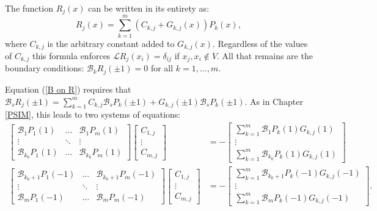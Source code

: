 \documentclass{book}
\begin{document}
The function $R_j(x)$ can be written in its entirety as:
\begin{equation}
R_j(x) = \sum_{k=1}^m (C_{k,j} + G_{k,j}(x) ) P_k(x) ,
\end{equation}
where $C_{k,j}$ is the arbitrary constant added to $G_{k,j}(x)$.
Regardless of the values of $C_{k,j}$ this formula enforces $\mathcal{L} R_j(x_i) = \delta_{ij}$ if $x_j, x_i \notin V$.
All that remains are the boundary conditions: $\mathcal{B}_k R_j( \pm 1) = 0$ for all $k = 1,...,m$.

Equation (\ref{B on R}) requires that $\mathcal{B}_s R_j(\pm 1) = \sum_{k=1}^m C_{k,j} \mathcal{B}_s P_k (\pm1) + G_{k,j} (\pm1) \mathcal{B}_s P_k(\pm1)$.
As in Chapter \ref{PSIM}, this leads to two systems of equations:
\begin{equation} \label{enforce bc}
\begin{aligned}
\begin{bmatrix} \mathcal{B}_1 P_1(1) & \dots &  \mathcal{B}_1 P_m(1) \\ \vdots & \ddots & \vdots \\  \mathcal{B}_{k_0} P_1(1) & \dots &  \mathcal{B}_{k_0} P_m(1)  \end{bmatrix}
\begin{bmatrix} C_{1,j} \\ \vdots \\ C_{m,j} \end{bmatrix}
& = - \begin{bmatrix} \sum_{k=1}^m \mathcal{B}_1 P_k(1) G_{k,j}(1) \\ \vdots \\ \sum_{k=1}^m \mathcal{B}_{k_0} P_k(1) G_{k,j}(1) \end{bmatrix} \\
\begin{bmatrix} \mathcal{B}_{k_0 + 1} P_1(-1) & \dots &  \mathcal{B}_{k_0+1} P_m(-1) \\ \vdots & \ddots & \vdots \\  \mathcal{B}_m P_1(-1) & \dots &  \mathcal{B}_m P_m(-1)  \end{bmatrix}
\begin{bmatrix} C_{1,j} \\ \vdots \\ C_{m,j} \end{bmatrix}
& = - \begin{bmatrix} \sum_{k=1}^m \mathcal{B}_{k_0+1} P_k(-1) G_{k,j}(-1) \\ \vdots \\ \sum_{k=1}^m \mathcal{B}_m P_k(-1) G_{k,j}(-1) \end{bmatrix} .
\end{aligned}
\end{equation}
\end{document}
